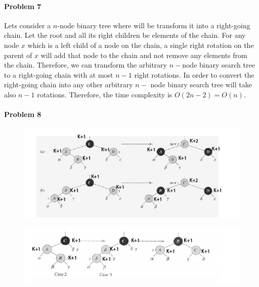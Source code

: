 \documentclass[11pt]{article}
\begin{document}
\paragraph{\noindent\textbf{\LARGE{Problem 7}}}
\begin{flushleft}
    Lets consider a $n$-node binary tree where will be transform it into a right-going chain. Let the root and all its right children be elements of the chain.
    For any node $x$ which is a left child of a node on the chain, a single right rotation on the parent of $x$ will add that node to the chain and not remove 
    any elements from the chain. Therefore, we can transform the arbitrary $n-$node binary search tree to a right-going chain with at most $n-1$ right  rotations.
    \newline
    \newline
    In order to convert the right-going chain into any other arbitrary $n-$ node binary search tree will take also $n-1$ rotations. Therefore, the time complexity is $O(2n-2) = O(n)$.
\end{flushleft}

\paragraph{\noindent\textbf{\LARGE{Problem 8}}}
\begin{flushleft}
\begin{figure}[htbp]
    \centerline{\includegraphics[scale=.5]{pict1.JPG}}
\end{figure}
\begin{figure}[htbp]
    \centerline{\includegraphics[scale=.5]{pict2.JPG}}
\end{figure}
    
\end{flushleft}
\end{document}
